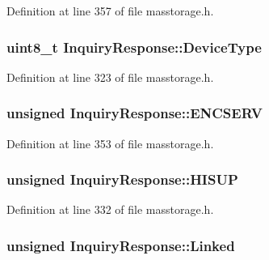 \-Definition at line 357 of file masstorage.\-h.

\hypertarget{struct_inquiry_response_abc2af027a176dc85d4e83f14eec7972e}{
\subsubsection[{\-Device\-Type}]{\setlength{\rightskip}{0pt plus 5cm}uint8\-\_\-t {\bf \-Inquiry\-Response\-::\-Device\-Type}}}\label{struct_inquiry_response_abc2af027a176dc85d4e83f14eec7972e}


\-Definition at line 323 of file masstorage.\-h.

\hypertarget{struct_inquiry_response_a6b4df8c5346c15186c9f200997bfb287}{
\subsubsection[{\-E\-N\-C\-S\-E\-R\-V}]{\setlength{\rightskip}{0pt plus 5cm}unsigned {\bf \-Inquiry\-Response\-::\-E\-N\-C\-S\-E\-R\-V}}}\label{struct_inquiry_response_a6b4df8c5346c15186c9f200997bfb287}


\-Definition at line 353 of file masstorage.\-h.

\hypertarget{struct_inquiry_response_a64b542b21ee54739136235785563e036}{
\subsubsection[{\-H\-I\-S\-U\-P}]{\setlength{\rightskip}{0pt plus 5cm}unsigned {\bf \-Inquiry\-Response\-::\-H\-I\-S\-U\-P}}}\label{struct_inquiry_response_a64b542b21ee54739136235785563e036}


\-Definition at line 332 of file masstorage.\-h.

\hypertarget{struct_inquiry_response_ac0ee71a9c07b0c1fd9ff09461a81fa0e}{
\subsubsection[{\-Linked}]{\setlength{\rightskip}{0pt plus 5cm}unsigned {\bf \-Inquiry\-Response\-::\-Linked}}}\label{struct_inquiry_response_ac0ee71a9c07b0c1fd9ff09461a81fa0e}


